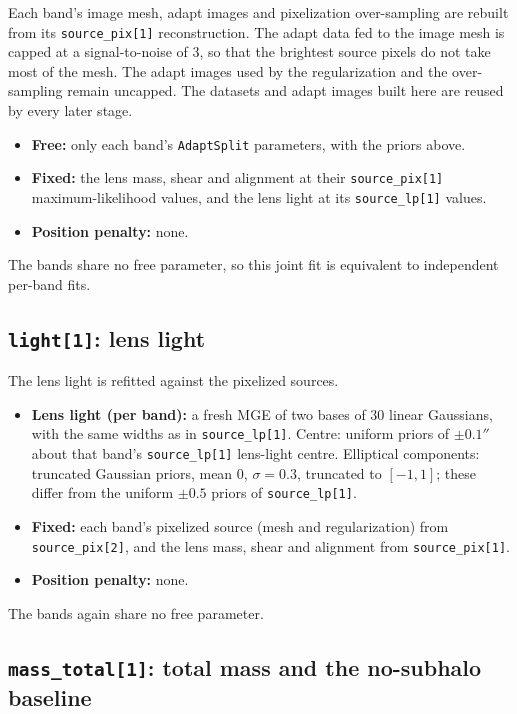 Each band's image mesh, adapt images and pixelization over-sampling are rebuilt from its
\texttt{source\_pix[1]} reconstruction. The adapt data fed to the image mesh is capped at a
signal-to-noise of 3, so that the brightest source pixels do not take most of the mesh. The adapt
images used by the regularization and the over-sampling remain uncapped. The datasets and adapt
images built here are reused by every later stage.
\begin{itemize}
    \item \textbf{Free:} only each band's \texttt{AdaptSplit} parameters, with the priors above.
    \item \textbf{Fixed:} the lens mass, shear and alignment at their \texttt{source\_pix[1]}
    maximum-likelihood values, and the lens light at its \texttt{source\_lp[1]} values.
    \item \textbf{Position penalty:} none.
\end{itemize}
The bands share no free parameter, so this joint fit is equivalent to independent per-band fits.

\subsection{\label{sc:pipeline_light}\texttt{light[1]}: lens light}

The lens light is refitted against the pixelized sources.
\begin{itemize}
    \item \textbf{Lens light (per band):} a fresh MGE of two bases of 30 linear Gaussians, with the
    same widths as in \texttt{source\_lp[1]}. Centre: uniform priors of $\pm 0.1''$ about that band's
    \texttt{source\_lp[1]} lens-light centre. Elliptical components: truncated Gaussian priors, mean
    0, $\sigma = 0.3$, truncated to $[-1, 1]$; these differ from the uniform $\pm 0.5$ priors of
    \texttt{source\_lp[1]}.
    \item \textbf{Fixed:} each band's pixelized source (mesh and regularization) from
    \texttt{source\_pix[2]}, and the lens mass, shear and alignment from \texttt{source\_pix[1]}.
    \item \textbf{Position penalty:} none.
\end{itemize}
The bands again share no free parameter.

\subsection{\label{sc:pipeline_mass}\texttt{mass\_total[1]}: total mass and the no-subhalo baseline}

